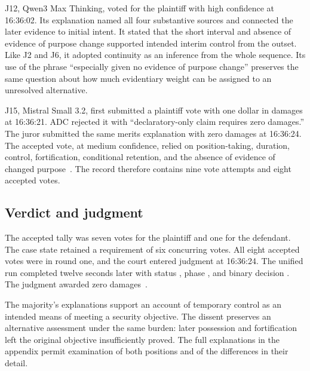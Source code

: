 J12, Qwen3 Max Thinking, voted for the plaintiff with high confidence at 16:36:02.  Its explanation named all four substantive sources and connected the later evidence to initial intent.  It stated that the short interval and absence of evidence of purpose change supported intended interim control from the outset.  Like J2 and J6, it adopted continuity as an inference from the whole sequence.  Its use of the phrase “especially given no evidence of purpose change” preserves the same question about how much evidentiary weight can be assigned to an unresolved alternative.

J15, Mistral Small 3.2, first submitted a plaintiff vote with one dollar in damages at 16:36:21.  ADC rejected it with “declaratory-only claim requires zero damages.”  The juror submitted the same merits explanation with zero damages at 16:36:24.  The accepted vote, at medium confidence, relied on position-taking, duration, control, fortification, conditional retention, and the absence of evidence of changed purpose~\cite[events 360--361]{record}.  The record therefore contains nine vote attempts and eight accepted votes.

\subsection{Verdict and judgment}

The accepted tally was seven votes for the plaintiff and one for the defendant.  The case state retained a requirement of six concurring votes.  All eight accepted votes were in round one, and the court entered judgment at 16:36:24.  The unified run completed twelve seconds later with status , phase , and binary decision .  The judgment awarded zero damages~\cite[events 362--363 and final state]{record}.

The majority's explanations support an account of temporary control as an intended means of meeting a security objective.  The dissent preserves an alternative assessment under the same burden: later possession and fortification left the original objective insufficiently proved.  The full explanations in the appendix permit examination of both positions and of the differences in their detail.
